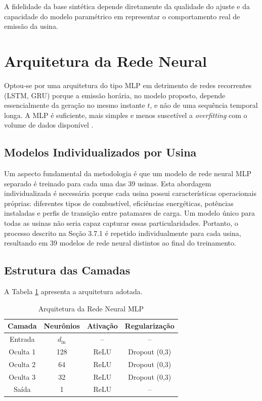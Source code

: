 A fidelidade da base sintética depende diretamente da qualidade do ajuste e da capacidade do modelo paramétrico em representar o comportamento real de emissão da usina.

\section{Arquitetura da Rede Neural}

Optou-se por uma arquitetura do tipo \ac{MLP} em detrimento de redes recorrentes (\ac{LSTM}, \ac{GRU}) porque a emissão horária, no modelo proposto, depende essencialmente da geração no mesmo instante \(t\), e não de uma sequência temporal longa. A \ac{MLP} é suficiente, mais simples e menos suscetível a \textit{overfitting} com o volume de dados disponível \cite{goodfellow2016deep}.


\subsection{Modelos Individualizados por Usina}

Um aspecto fundamental da metodologia é que um modelo de rede neural \ac{MLP} separado é treinado para cada uma das 39 usinas. Esta abordagem individualizada é necessária porque cada usina possui características operacionais próprias: diferentes tipos de combustível, eficiências energéticas, potências instaladas e perfis de transição entre patamares de carga. Um modelo único para todas as usinas não seria capaz capturar essas particularidades. Portanto, o processo descrito na Seção 3.7.1 é repetido individualmente para cada usina, resultando em 39 modelos de rede neural distintos ao final do treinamento.

\subsection{Estrutura das Camadas}

A Tabela \ref{tab:arquitetura} apresenta a arquitetura adotada.

\begin{table}[H]
    \centering
    \renewcommand{\arraystretch}{1.5}
    \begin{tabular}{|c|c|c|c|}
        \hline
        \textbf{Camada} & \textbf{Neurônios} & \textbf{Ativação} & \textbf{Regularização} \\
        \hline
        Entrada & \(d_{\text{in}}\) & -- & -- \\
        Oculta 1 & 128 & \ac{ReLU} & Dropout (0,3) \\
        Oculta 2 & 64 & \ac{ReLU} & Dropout (0,3) \\
        Oculta 3 & 32 & \ac{ReLU} & Dropout (0,3) \\
        Saída & 1 & \ac{ReLU} & -- \\
        \hline
    \end{tabular}
    \caption{Arquitetura da Rede Neural MLP}
    \label{tab:arquitetura}
\end{table}

